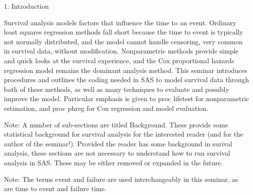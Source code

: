 1. Introduction

Survival analysis models factors that influence the time to an event. Ordinary least squares regression methods fall short because the time to event is typically not normally distributed, and the model cannot handle censoring, very common in survival data, without modification. Nonparametric methods provide simple and quick looks at the survival experience, and the Cox proportional hazards regression model remains the dominant analysis method. This seminar introduces procedures and outlines the coding needed in SAS to model survival data through both of these methods, as well as many techniques to evaluate and possibly improve the model. Particular emphasis is given to proc lifetest for nonparametric estimation, and proc phreg for Cox regression and model evaluation.

Note: A number of sub-sections are titled Background. These provide some statistical background for survival analysis for the interested reader (and for the author of the seminar!). Provided the reader has some background in surival analysis, these sections are not necessary to understand how to run survival analysis in SAS. These may be either removed or expanded in the future.

Note: The terms event and failure are used interchangeably in this seminar, as are time to event and failure time.
